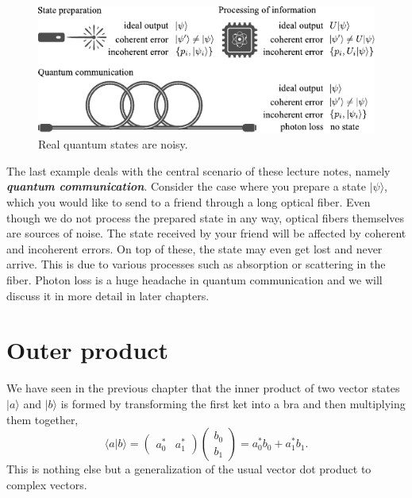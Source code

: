 \begin{figure}[t]
    \centering
    \includegraphics[width=\textwidth]{lesson3/3-1_noise.pdf}
    \caption[Noisy world]{Real quantum states are noisy.}
    \label{fig:3-1_noise}
\end{figure}

The last example deals with the central scenario of these lecture notes, namely \textit{\textbf{quantum communication}}.
Consider the case where you prepare a state $|\psi\rangle$, which you would like to send to a friend through a long optical fiber.
Even though we do not process the prepared state in any way, optical fibers themselves are sources of noise.
The state received by your friend will be affected by coherent and incoherent errors.
On top of these, the state may even get lost and never arrive.
This is due to various processes such as absorption or scattering in the fiber.
Photon loss is a huge headache in quantum communication and we will discuss it in more detail in later chapters.





\section{Outer product}
\label{sec:3-2_outer_product}

We have seen in the previous chapter that the inner product of two vector states $|a\rangle$ and $|b\rangle$ is formed by transforming the first ket into a bra and then multiplying them together,
\begin{equation}
    \langle a | b\rangle = \begin{pmatrix} a_0^* & a_1^* \end{pmatrix} \begin{pmatrix} b_0 \\ b_1 \end{pmatrix} = a_0^* b_0 + a_1^* b_1.
\end{equation}
This is nothing else but a generalization of the usual vector dot product to complex vectors.

